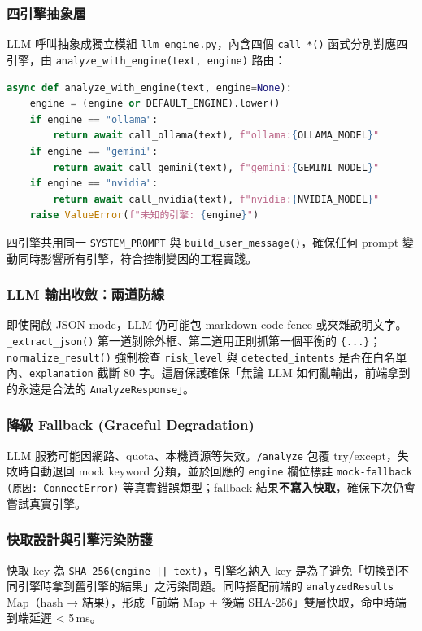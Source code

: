 \documentclass[11pt, a4paper]{article}
\begin{document}
\subsubsection{四引擎抽象層}
LLM 呼叫抽象成獨立模組 \texttt{llm\_engine.py}，內含四個 \texttt{call\_*()} 函式分別對應四引擎，由 \texttt{analyze\_with\_engine(text, engine)} 路由：

\begin{lstlisting}[language=Python, caption={多引擎路由}]
async def analyze_with_engine(text, engine=None):
    engine = (engine or DEFAULT_ENGINE).lower()
    if engine == "ollama":
        return await call_ollama(text), f"ollama:{OLLAMA_MODEL}"
    if engine == "gemini":
        return await call_gemini(text), f"gemini:{GEMINI_MODEL}"
    if engine == "nvidia":
        return await call_nvidia(text), f"nvidia:{NVIDIA_MODEL}"
    raise ValueError(f"未知的引擎: {engine}")
\end{lstlisting}

四引擎共用同一 \texttt{SYSTEM\_PROMPT} 與 \texttt{build\_user\_message()}，確保任何 prompt 變動同時影響所有引擎，符合控制變因的工程實踐。

\subsubsection{LLM 輸出收斂：兩道防線}
即使開啟 JSON mode，LLM 仍可能包 markdown code fence 或夾雜說明文字。\texttt{\_extract\_json()} 第一道剝除外框、第二道用正則抓第一個平衡的 \texttt{\{...\}}；\texttt{normalize\_result()} 強制檢查 \texttt{risk\_level} 與 \texttt{detected\_intents} 是否在白名單內、\texttt{explanation} 截斷 80 字。這層保護確保「無論 LLM 如何亂輸出，前端拿到的永遠是合法的 \texttt{AnalyzeResponse}」。

\subsubsection{降級 Fallback (Graceful Degradation)}
LLM 服務可能因網路、quota、本機資源等失效。\texttt{/analyze} 包覆 try/except，失敗時自動退回 mock keyword 分類，並於回應的 \texttt{engine} 欄位標註 \texttt{mock-fallback (原因: ConnectError)} 等真實錯誤類型；fallback 結果\textbf{不寫入快取}，確保下次仍會嘗試真實引擎。

\subsubsection{快取設計與引擎污染防護}
快取 key 為 \texttt{SHA-256(engine\,||\,text)}，引擎名納入 key 是為了避免「切換到不同引擎時拿到舊引擎的結果」之污染問題。同時搭配前端的 \texttt{analyzedResults} Map（hash → 結果），形成「前端 Map + 後端 SHA-256」雙層快取，命中時端到端延遲 \textless{} 5\,ms。
\end{document}
